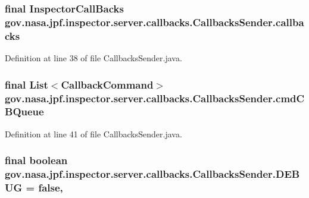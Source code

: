 \subsubsection[{\texorpdfstring{callbacks}{callbacks}}]{\setlength{\rightskip}{0pt plus 5cm}final {\bf Inspector\+Call\+Backs} gov.\+nasa.\+jpf.\+inspector.\+server.\+callbacks.\+Callbacks\+Sender.\+callbacks\hspace{0.3cm}{\ttfamily [private]}}\hypertarget{classgov_1_1nasa_1_1jpf_1_1inspector_1_1server_1_1callbacks_1_1_callbacks_sender_aacb11282361096d47169bc5010803c75}{}\label{classgov_1_1nasa_1_1jpf_1_1inspector_1_1server_1_1callbacks_1_1_callbacks_sender_aacb11282361096d47169bc5010803c75}


Definition at line 38 of file Callbacks\+Sender.\+java.

\subsubsection[{\texorpdfstring{cmd\+C\+B\+Queue}{cmdCBQueue}}]{\setlength{\rightskip}{0pt plus 5cm}final List$<${\bf Callback\+Command}$>$ gov.\+nasa.\+jpf.\+inspector.\+server.\+callbacks.\+Callbacks\+Sender.\+cmd\+C\+B\+Queue\hspace{0.3cm}{\ttfamily [private]}}\hypertarget{classgov_1_1nasa_1_1jpf_1_1inspector_1_1server_1_1callbacks_1_1_callbacks_sender_a1f3a8a41d1d0d1e0f992ad493f12e6e0}{}\label{classgov_1_1nasa_1_1jpf_1_1inspector_1_1server_1_1callbacks_1_1_callbacks_sender_a1f3a8a41d1d0d1e0f992ad493f12e6e0}


Definition at line 41 of file Callbacks\+Sender.\+java.

\subsubsection[{\texorpdfstring{D\+E\+B\+UG}{DEBUG}}]{\setlength{\rightskip}{0pt plus 5cm}final boolean gov.\+nasa.\+jpf.\+inspector.\+server.\+callbacks.\+Callbacks\+Sender.\+D\+E\+B\+UG = false\hspace{0.3cm}{\ttfamily [static]}, {\ttfamily [protected]}}\hypertarget{classgov_1_1nasa_1_1jpf_1_1inspector_1_1server_1_1callbacks_1_1_callbacks_sender_a10aff7ac289e87978a9bebd2ef3c87ae}{}\label{classgov_1_1nasa_1_1jpf_1_1inspector_1_1server_1_1callbacks_1_1_callbacks_sender_a10aff7ac289e87978a9bebd2ef3c87ae}


